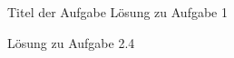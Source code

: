 \documentclass{disloloesung}
\begin{document}
\begin{sheet}{1}

    \begin{aufgabe}{1}{Titel der Aufgabe}
        L\"osung zu Aufgabe 1
    \end{aufgabe}

    \begin{aufgabe*}{2.4}{}
        L\"osung zu Aufgabe 2.4 
    \end{aufgabe*}
\end{sheet}
\end{document}
